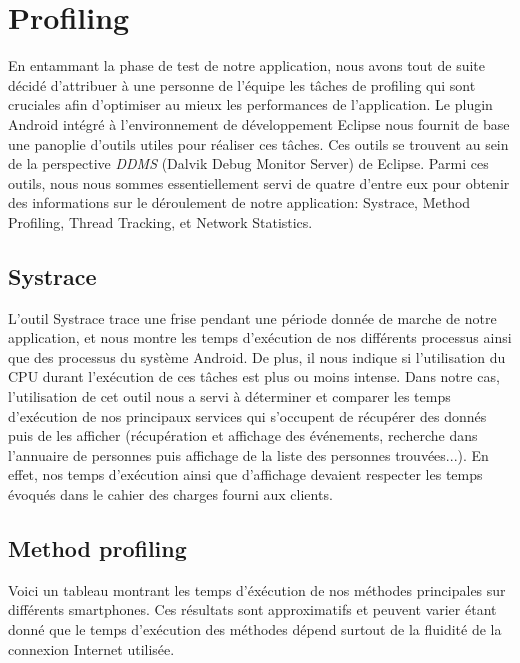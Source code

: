 \chapter{Profiling}
En entammant la phase de test de notre application, nous avons tout de suite décidé d'attribuer à une personne de l'équipe les tâches de profiling qui sont cruciales afin d'optimiser au mieux les performances de l'application. 
Le plugin Android intégré à l'environnement de développement Eclipse nous fournit de base une panoplie d'outils utiles pour réaliser ces tâches. Ces outils se trouvent au sein de la perspective \emph{DDMS} (Dalvik Debug Monitor Server) de Eclipse.
Parmi ces outils, nous nous sommes essentiellement servi de quatre d’entre eux pour obtenir des informations sur le déroulement de notre application: Systrace, Method Profiling, Thread Tracking, et Network Statistics.
 
\section{Systrace}
L'outil Systrace trace une frise pendant une période donnée de marche de notre application, et nous montre les temps d'exécution de nos différents processus ainsi que des processus du système Android. De plus, il nous indique si l'utilisation du CPU durant l'exécution de ces tâches est plus ou moins intense. Dans notre cas, l'utilisation de cet outil nous a servi à déterminer et comparer les temps d'exécution de nos principaux services qui s'occupent de récupérer des donnés puis de les afficher (récupération et affichage des événements, recherche dans l'annuaire de personnes puis affichage de la liste des personnes trouvées...). En effet, nos temps d'exécution ainsi que d'affichage devaient respecter les temps évoqués dans le cahier des charges fourni aux clients.

\section{Method profiling}
Voici un tableau montrant les temps d’éxécution de nos méthodes principales sur différents smartphones. Ces résultats sont approximatifs et peuvent varier étant donné que le temps d’exécution des méthodes dépend surtout de la fluidité de la connexion Internet utilisée.\\

